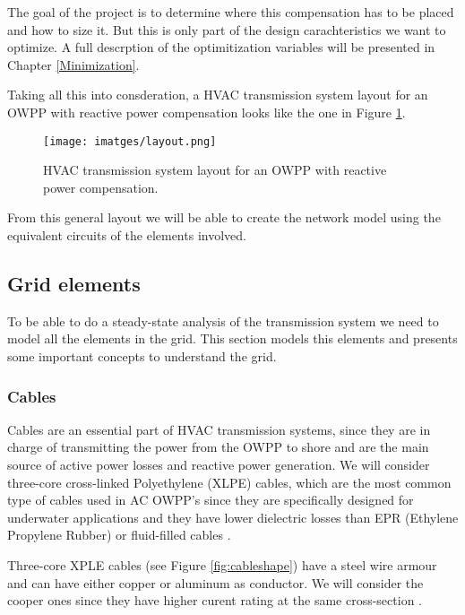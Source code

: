 \documentclass[a4paper,11pt, titlepage, twoside]{article}
\begin{document}
The goal of the project is to determine where this compensation has to be placed  and how to size it. But this is only part of the design carachteristics we want to optimize. A full descrption of the optimitization variables will be
presented in Chapter \ref{Minimization}.

Taking all this into consderation, a HVAC transmission system layout for an OWPP with reactive power compensation looks like the one in Figure \ref{fig:fulltransmission}.
\begin{figure}[H] %
    \centering
    \texttt{[image: imatges/layout.png]}
    \caption{HVAC transmission system layout for an OWPP with reactive power compensation\cite{paperbase}.}
    \label{fig:fulltransmission} %
\end{figure}

From this general layout we will be able to create the network model using the equivalent circuits of the  elements involved.

\subsection{Grid elements}

To be able to do a steady-state analysis of the transmission system we need to model all the elements in the grid. This section models this elements and presents
some important concepts to understand the grid.




\subsubsection{Cables}

Cables are an essential part of HVAC transmission systems, since they are in charge of transmitting the power from the OWPP to
shore and are the main source of active power losses and reactive power generation. We will consider  three-core cross-linked Polyethylene (XLPE) cables, which are the most common type of cables used in  AC OWPP's since they are
specifically designed for underwater applications and they have lower dielectric losses than EPR (Ethylene Propylene Rubber) or fluid-filled cables \cite{ABB2}.  \par

Three-core XPLE cables (see Figure \ref{fig:cableshape}) have a steel wire armour and can have either copper or aluminum as conductor. We will consider the cooper ones since they have higher curent rating at the same cross-section \cite{ABB}. 
\end{document}
